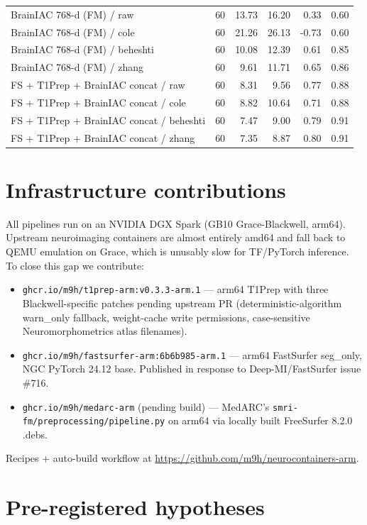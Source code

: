 \documentclass[11pt]{article}
\begin{document}
\begin{center}
\begin{tabular}{lrrrrr}
BrainIAC 768-d (FM) / raw & 60 & 13.73 & 16.20 & 0.33 & 0.60 \\
BrainIAC 768-d (FM) / cole & 60 & 21.26 & 26.13 & -0.73 & 0.60 \\
BrainIAC 768-d (FM) / beheshti & 60 & 10.08 & 12.39 & 0.61 & 0.85 \\
BrainIAC 768-d (FM) / zhang & 60 & 9.61 & 11.71 & 0.65 & 0.86 \\
FS + T1Prep + BrainIAC concat / raw & 60 & 8.31 & 9.56 & 0.77 & 0.88 \\
FS + T1Prep + BrainIAC concat / cole & 60 & 8.82 & 10.64 & 0.71 & 0.88 \\
FS + T1Prep + BrainIAC concat / beheshti & 60 & 7.47 & 9.00 & 0.79 & 0.91 \\
FS + T1Prep + BrainIAC concat / zhang & 60 & 7.35 & 8.87 & 0.80 & 0.91 \\
\bottomrule
\end{tabular}
\end{center}


\section{Infrastructure contributions}

All pipelines run on an NVIDIA DGX Spark (GB10 Grace-Blackwell, arm64).
Upstream neuroimaging containers are almost entirely amd64 and fall
back to QEMU emulation on Grace, which is unusably slow for TF/PyTorch
inference. To close this gap we contribute:

\begin{itemize}
  \item \texttt{ghcr.io/m9h/t1prep-arm:v0.3.3-arm.1} --- arm64 T1Prep
    with three Blackwell-specific patches pending upstream PR
    (deterministic-algorithm warn\_only fallback, weight-cache write
    permissions, case-sensitive Neuromorphometrics atlas filenames).
  \item \texttt{ghcr.io/m9h/fastsurfer-arm:6b6b985-arm.1} --- arm64
    FastSurfer seg\_only, NGC PyTorch 24.12 base. Published in
    response to Deep-MI/FastSurfer issue \#716.
  \item \texttt{ghcr.io/m9h/medarc-arm} (pending build) --- MedARC's
    \texttt{smri-fm/preprocessing/pipeline.py} on arm64 via locally
    built FreeSurfer 8.2.0 .debs.
\end{itemize}

Recipes + auto-build workflow at
\url{https://github.com/m9h/neurocontainers-arm}.

\section{Pre-registered hypotheses}
\end{document}
